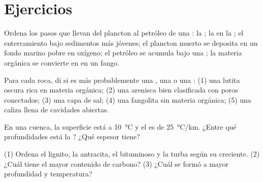 \section{Ejercicios}

\begin{exercise}[$\star$]\label{exo:g11:fossil-fuel-geology:1}
Ordena los pasos que llevan del plancton al petróleo de una : la
; la  en la ; el enterramiento bajo
sedimentos más jóvenes; el plancton muerto se deposita en un fondo marino
pobre en oxígeno; el petróleo se acumula bajo una ; la materia
orgánica se convierte en  en un fango.
\end{exercise}

\begin{exercise}[$\star$]\label{exo:g11:fossil-fuel-geology:2}
Para cada roca, di si es más probablemente una , una  o una : (1) una lutita oscura rica en materia orgánica;
(2) una arenisca bien clasificada con poros conectados; (3) una capa de sal;
(4) una fangolita sin materia orgánica; (5) una caliza llena de cavidades
abiertas.
\end{exercise}

\begin{exercise}[$\star$]\label{exo:g11:fossil-fuel-geology:3}
En una cuenca, la superficie está a \qty{10}{\degreeCelsius} y el  es de \qty{25}{\degreeCelsius/km}. ¿Entre qué profundidades está la
? ¿Qué espesor tiene?
\end{exercise}

\begin{exercise}[$\star$]\label{exo:g11:fossil-fuel-geology:4}
(1) Ordena el lignito, la antracita, el  bituminoso y la turba según su
 creciente. (2) ¿Cuál tiene el mayor contenido de carbono? (3) ¿Cuál se
formó a mayor profundidad y temperatura?
\end{exercise}

